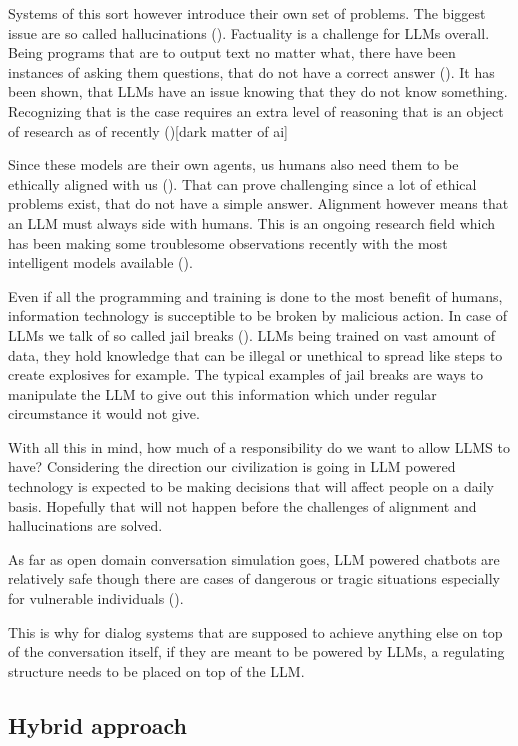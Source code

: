 \documentclass[12pt]{report}
\begin{document}
{Systems of this sort however introduce their own set of problems.
The biggest issue are so called hallucinations ().
Factuality is a challenge for LLMs overall.
Being programs that are to output text no matter what,
there have been instances of asking them questions,
that do not have a correct answer ().
It has been shown, that LLMs have an issue
knowing that they do not know something.
Recognizing that is the case requires
an extra level of reasoning
that is an object of research as of recently ()[dark matter of ai]

Since these models are their own agents,
us humans also need them to be ethically aligned with us ().
That can prove challenging since a lot of ethical problems exist,
that do not have a simple answer.
Alignment however means that an LLM must always side with humans.
This is an ongoing research field which has been making some
troublesome observations recently with the most intelligent models available ().

Even if all the programming and training is done to the most benefit of humans,
information technology is succeptible to be broken by malicious action.
In case of LLMs we talk of so called jail breaks ().
LLMs being trained on vast amount of data,
they hold knowledge that can be illegal or unethical to spread
like steps to create explosives for example.
The typical examples of jail breaks are ways to manipulate
the LLM to give out this information
which under regular circumstance it would not give.

With all this in mind,
how much of a responsibility do we want to allow LLMS to have?
Considering the direction our civilization is going in
LLM powered technology is expected to be making decisions
that will affect people on a daily basis.
Hopefully that will not happen before
the challenges of alignment and hallucinations
are solved.

As far as open domain conversation simulation goes,
LLM powered chatbots are relatively safe
though there are cases of dangerous or tragic situations
especially for vulnerable individuals ().

This is why for dialog systems that are supposed to achieve
anything else on top of the conversation itself,
if they are meant to be powered by LLMs,
a regulating structure needs to be placed on top of the LLM.

\subsection{Hybrid approach}

}
\end{document}
